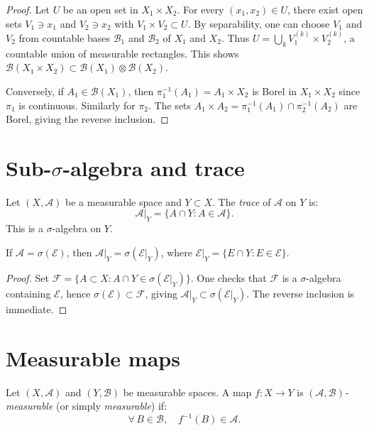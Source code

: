 \begin{proof}
Let $U$ be an open set in $X_1 \times X_2$. For every $(x_1, x_2) \in U$, there
exist open sets $V_1 \ni x_1$ and $V_2 \ni x_2$ with $V_1 \times V_2 \subset U$.
By separability, one can choose $V_1$ and $V_2$ from countable bases
$\mathcal{B}_1$ and $\mathcal{B}_2$ of $X_1$ and $X_2$. Thus
$U = \bigcup_k V_1^{(k)} \times V_2^{(k)}$, a countable union of measurable
rectangles. This shows $\mathcal{B}(X_1 \times X_2) \subset
\mathcal{B}(X_1) \otimes \mathcal{B}(X_2)$.

Conversely, if $A_1 \in \mathcal{B}(X_1)$, then $\pi_1^{-1}(A_1) =
A_1 \times X_2$ is Borel in $X_1 \times X_2$ since $\pi_1$ is continuous. Similarly
for $\pi_2$. The sets $A_1 \times A_2 = \pi_1^{-1}(A_1) \cap \pi_2^{-1}(A_2)$ are
Borel, giving the reverse inclusion.
\end{proof}

\section{Sub-$\sigma$-algebra and trace}

\begin{definition}[Trace]
Let $(X, \mathcal{A})$ be a measurable space and $Y \subset X$. The \emph{trace} of
$\mathcal{A}$ on $Y$ is:
\[
\mathcal{A}|_Y = \{A \cap Y : A \in \mathcal{A}\}.
\]
This is a $\sigma$-algebra on $Y$.
\end{definition}

\begin{proposition}
If $\mathcal{A} = \sigma(\mathcal{E})$, then
$\mathcal{A}|_Y = \sigma(\mathcal{E}|_Y)$, where
$\mathcal{E}|_Y = \{E \cap Y : E \in \mathcal{E}\}$.
\end{proposition}

\begin{proof}
Set $\mathcal{F} = \{A \subset X : A \cap Y \in \sigma(\mathcal{E}|_Y)\}$.
One checks that $\mathcal{F}$ is a $\sigma$-algebra containing $\mathcal{E}$, hence
$\sigma(\mathcal{E}) \subset \mathcal{F}$, giving
$\mathcal{A}|_Y \subset \sigma(\mathcal{E}|_Y)$. The reverse inclusion is immediate.
\end{proof}

\section{Measurable maps}

\begin{definition}
Let $(X, \mathcal{A})$ and $(Y, \mathcal{B})$ be measurable spaces. A map
$f : X \to Y$ is \emph{$(\mathcal{A}, \mathcal{B})$-measurable} (or simply
\emph{measurable}) if:
\[
\forall\, B \in \mathcal{B}, \quad f^{-1}(B) \in \mathcal{A}.
\]
\end{definition}


